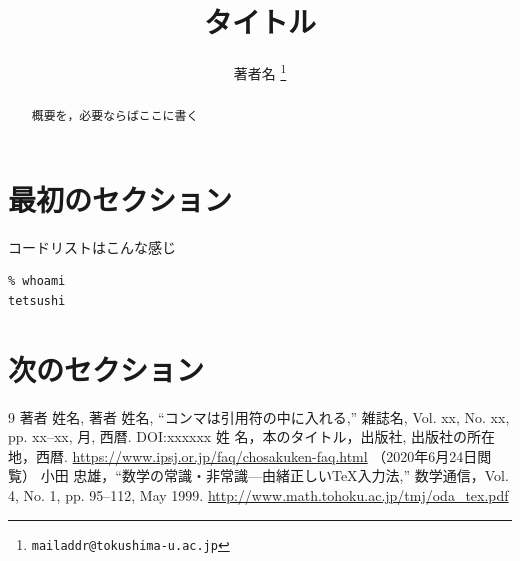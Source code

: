 \documentclass[11pt, a4j]{jsarticle}
\title{\textbf{タイトル}}
\author{著者名 \thanks{\texttt{mailaddr@tokushima-u.ac.jp}}}
\begin{document}
\maketitle

\begin{abstract}
概要を，必要ならばここに書く
\end{abstract}

\tableofcontents

\section{最初のセクション}

コードリストはこんな感じ
\begin{lstlisting}
% whoami
tetsushi
\end{lstlisting}

\appendix 

\section{次のセクション}


\begin{thebibliography}{9}
著者 姓名, 著者 姓名,
``コンマは引用符の中に入れる,''
雑誌名,
Vol. xx, No. xx, pp. xx--xx, 月, 西暦. 
DOI:xxxxxx
%
姓 名，本のタイトル，出版社, 出版社の所在地，西暦.
%
\url{https://www.ipsj.or.jp/faq/chosakuken-faq.html}
（2020年6月24日閲覧）
%
小田 忠雄，``数学の常識・非常識---由緒正しい\TeX 入力法,''
数学通信，Vol. 4, No. 1, pp. 95--112, May 1999.
\url{http://www.math.tohoku.ac.jp/tmj/oda_tex.pdf}
%
\end{thebibliography}

%
%
\end{document}
